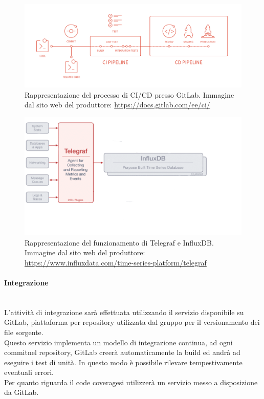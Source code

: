 \begin{figure}[H]
	\begin{center}
		\includegraphics[scale=0.18]{./images/cicd_pipeline_gitlab.png}
		\caption{Rappresentazione del processo di CI/CD presso GitLab. Immagine dal sito web del produttore: \url{https://docs.gitlab.com/ee/ci/}}
	\end{center}
\end{figure}

\begin{figure}[H]
	\begin{center}
		\includegraphics[scale=0.4]{./images/influxTelegraf.png}
		\caption{Rappresentazione del funzionamento di Telegraf e InfluxDB. Immagine dal sito web del produttore: \url{https://www.influxdata.com/time-series-platform/telegraf}}
	\end{center}
\end{figure}

\paragraph{Integrazione}\label{Progettazione_Integrazione}\-\\
L'attività di integrazione sarà effettuata utilizzando il servizio disponibile su GitLab\glossario, piattaforma per repository utilizzata dal gruppo per il versionamento dei file sorgente.\\
Questo servizio implementa un modello di integrazione continua, ad ogni commit\glossario nel repository\glossario, GitLab creerà automaticamente la build ed andrà ad eseguire i test di unità. In questo modo è possibile rilevare tempestivamente eventuali errori.\\
Per quanto riguarda il code coverage\glossario si utilizzerà un servizio messo a disposizione da GitLab.\\


